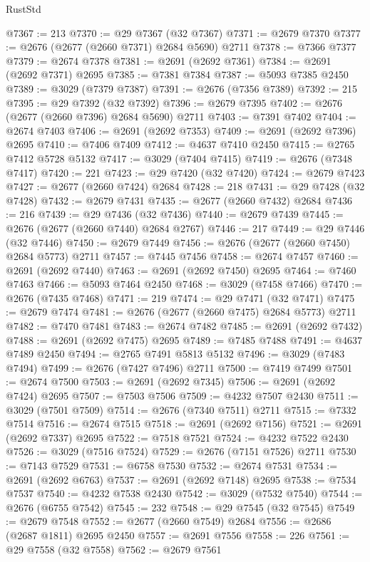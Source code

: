 \begin{lexlean}{RustStd}
\begin{coremodule}
@7367 := 213
@7370 := @29 @7367 (@32 @7367)
@7371 := @2679 @7370
@7377 := @2676 (@2677 (@2660 @7371) @2684 @5690) @2711
@7378 := @7366 @7377
@7379 := @2674 @7378
@7381 := @2691 (@2692 @7361)
@7384 := @2691 (@2692 @7371) @2695
@7385 := @7381 @7384
@7387 := @5093 @7385 @2450
@7389 := @3029 (@7379 @7387)
@7391 := @2676 (@7356 @7389)
@7392 := 215
@7395 := @29 @7392 (@32 @7392)
@7396 := @2679 @7395
@7402 := @2676 (@2677 (@2660 @7396) @2684 @5690) @2711
@7403 := @7391 @7402
@7404 := @2674 @7403
@7406 := @2691 (@2692 @7353)
@7409 := @2691 (@2692 @7396) @2695
@7410 := @7406 @7409
@7412 := @4637 @7410 @2450
@7415 := @2765 @7412 @5728 @5132
@7417 := @3029 (@7404 @7415)
@7419 := @2676 (@7348 @7417)
@7420 := 221
@7423 := @29 @7420 (@32 @7420)
@7424 := @2679 @7423
@7427 := @2677 (@2660 @7424) @2684
@7428 := 218
@7431 := @29 @7428 (@32 @7428)
@7432 := @2679 @7431
@7435 := @2677 (@2660 @7432) @2684
@7436 := 216
@7439 := @29 @7436 (@32 @7436)
@7440 := @2679 @7439
@7445 := @2676 (@2677 (@2660 @7440) @2684 @2767)
@7446 := 217
@7449 := @29 @7446 (@32 @7446)
@7450 := @2679 @7449
@7456 := @2676 (@2677 (@2660 @7450) @2684 @5773) @2711
@7457 := @7445 @7456
@7458 := @2674 @7457
@7460 := @2691 (@2692 @7440)
@7463 := @2691 (@2692 @7450) @2695
@7464 := @7460 @7463
@7466 := @5093 @7464 @2450
@7468 := @3029 (@7458 @7466)
@7470 := @2676 (@7435 @7468)
@7471 := 219
@7474 := @29 @7471 (@32 @7471)
@7475 := @2679 @7474
@7481 := @2676 (@2677 (@2660 @7475) @2684 @5773) @2711
@7482 := @7470 @7481
@7483 := @2674 @7482
@7485 := @2691 (@2692 @7432)
@7488 := @2691 (@2692 @7475) @2695
@7489 := @7485 @7488
@7491 := @4637 @7489 @2450
@7494 := @2765 @7491 @5813 @5132
@7496 := @3029 (@7483 @7494)
@7499 := @2676 (@7427 @7496) @2711
@7500 := @7419 @7499
@7501 := @2674 @7500
@7503 := @2691 (@2692 @7345)
@7506 := @2691 (@2692 @7424) @2695
@7507 := @7503 @7506
@7509 := @4232 @7507 @2430
@7511 := @3029 (@7501 @7509)
@7514 := @2676 (@7340 @7511) @2711
@7515 := @7332 @7514
@7516 := @2674 @7515
@7518 := @2691 (@2692 @7156)
@7521 := @2691 (@2692 @7337) @2695
@7522 := @7518 @7521
@7524 := @4232 @7522 @2430
@7526 := @3029 (@7516 @7524)
@7529 := @2676 (@7151 @7526) @2711
@7530 := @7143 @7529
@7531 := @6758 @7530
@7532 := @2674 @7531
@7534 := @2691 (@2692 @6763)
@7537 := @2691 (@2692 @7148) @2695
@7538 := @7534 @7537
@7540 := @4232 @7538 @2430
@7542 := @3029 (@7532 @7540)
@7544 := @2676 (@6755 @7542)
@7545 := 232
@7548 := @29 @7545 (@32 @7545)
@7549 := @2679 @7548
@7552 := @2677 (@2660 @7549) @2684
@7556 := @2686 (@2687 @1811) @2695 @2450
@7557 := @2691 @7556
@7558 := 226
@7561 := @29 @7558 (@32 @7558)
@7562 := @2679 @7561

\end{coremodule}
\end{lexlean}

